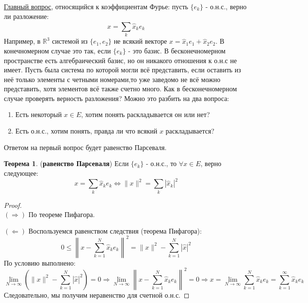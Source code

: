 \documentclass[12pt]{article}
\newcommand{\MR}{\mathbb{R}}
\theoremstyle{definition}
\newtheorem{theorem}{Теорема}
\newcommand{\ddsum}[2]{\displaystyle\sum\limits_{#1}^{#2}}
\begin{document}
\uline{Главный вопрос}, относящийся к коэффициентам Фурье: пусть $\{e_k\}$ - о.н.с., верно ли разложение: 
$$
	x = \ddsum{k}{}\hat{x}_ke_k
$$
Например, в $\MR^3$ системой из $\{e_1,e_2\}$ не всякий векторе $x = \hat{x}_1e_1 + \hat{x}_2 e_2$. В конечномерном случае это так, если $\{e_k\}$ - это базис. В бесконечномерном пространстве есть алгебраический базис, но он никакого отношения к о.н.с не имеет. Пусть была система по которой могли всё представить, если оставить из неё только элементы с четными номерами,то уже заведомо не всё можно представить, хотя элементов всё также счетно много. Как в бесконечномерном случае проверять верность разложения? Можно это разбить на два вопроса:
\begin{enumerate}[label=(\arabic*)]
	\item Есть некоторый $x \in E$, хотим понять раскладывается он или нет? 
	\item Есть о.н.с., хотим понять, правда ли что всякий $x$ раскладывается?
\end{enumerate}

Ответом на первый вопрос будет равенство Парсеваля.
\newpage
\begin{theorem}(\textbf{равенство Парсеваля})
	Если $\{e_k\}$ - о.н.с., то $\forall x \in E$, верно следующее:
	$$
		x = \ddsum{k}{}\hat{x}_ke_k \Leftrightarrow \|x\|^2 =\ddsum{k}{}\left|\hat{x}_k\right|^2	
	$$
\end{theorem}
\begin{proof}\hfill\\
	$(\Rightarrow)$ По теореме Пифагора.
	
	$(\Leftarrow)$ Воспользуемся равенством следствия (теорема Пифагора):
	$$
		0 \leq \left\|x - \ddsum{k = 1}{N}\hat{x}_k e_k \right\|^2 = \|x\|^2 - \ddsum{k = 1}{N}\left|\hat{x}\right|^2
	$$
	По условию выполнено:
	$$
		\lim\limits_{N \to \infty} \left(\|x\|^2 - \ddsum{k = 1}{N}\left|\hat{x}\right|^2\right) = 0 \Rightarrow \lim\limits_{N \to \infty} \left\|x - \ddsum{k = 1}{N}\hat{x}_k e_k \right\|^2 = 0 \Rightarrow x = \lim\limits_{N \to \infty}\ddsum{k = 1}{N}\hat{x}_k e_k = \ddsum{k = 1}{\infty}\hat{x}_k e_k
	$$
	Следовательно, мы получим неравенство для счетной о.н.с.
\end{proof}
\end{document}
